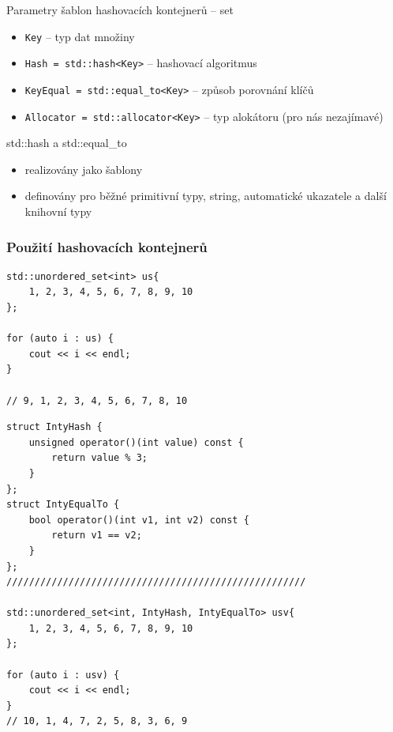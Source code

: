 \begin{frame}[fragile]
\begin{block}{Parametry šablon hashovacích kontejnerů -- set}
\begin{itemize}
\item \lstinline|Key| -- typ dat množiny
\item \lstinline|Hash = std::hash<Key>| -- hashovací algoritmus
\item \lstinline|KeyEqual = std::equal_to<Key>| -- způsob porovnání klíčů
\item \lstinline|Allocator = std::allocator<Key>| -- typ alokátoru (pro nás nezajímavé)
\end{itemize}
\end{block}

\begin{block}{std::hash a std::equal\_to}
\begin{itemize}
\item realizovány jako šablony
\item definovány pro běžné primitivní typy, string, automatické ukazatele a další knihovní typy
\end{itemize}
\end{block}
\end{frame}


\begin{frame}[fragile]
\frametitle{Použití hashovacích kontejnerů}
\begin{yesblock}
\begin{lstlisting}
std::unordered_set<int> us{
	1, 2, 3, 4, 5, 6, 7, 8, 9, 10
};

for (auto i : us) {
	cout << i << endl;
}

// 9, 1, 2, 3, 4, 5, 6, 7, 8, 10
\end{lstlisting}
\end{yesblock}
\end{frame}


\begin{frame}[fragile]
\begin{yesblock}
\begin{lstlisting}[basicstyle=\small]
struct IntyHash {
	unsigned operator()(int value) const {
		return value % 3;
	}
};
struct IntyEqualTo {
	bool operator()(int v1, int v2) const {
		return v1 == v2;
	}
};
/////////////////////////////////////////////////////

std::unordered_set<int, IntyHash, IntyEqualTo> usv{
	1, 2, 3, 4, 5, 6, 7, 8, 9, 10
};

for (auto i : usv) {
	cout << i << endl;
}
// 10, 1, 4, 7, 2, 5, 8, 3, 6, 9
\end{lstlisting}
\end{yesblock}
\end{frame}
